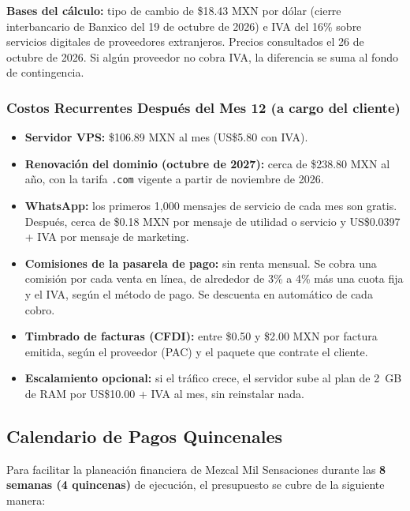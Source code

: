 \documentclass[11pt,letterpaper]{article}
\begin{document}
\noindent\textbf{Bases del cálculo:} tipo de cambio de \$18.43 MXN por dólar (cierre interbancario de Banxico del 19 de octubre de 2026) e IVA del 16\% sobre servicios digitales de proveedores extranjeros. Precios consultados el 26 de octubre de 2026. Si algún proveedor no cobra IVA, la diferencia se suma al fondo de contingencia.

\subsubsection{Costos Recurrentes Después del Mes 12 (a cargo del cliente)}

\begin{itemize}[leftmargin=1.5cm]
    \item \textbf{Servidor VPS:} \$106.89 MXN al mes (US\$5.80 con IVA).
    \item \textbf{Renovación del dominio (octubre de 2027):} cerca de \$238.80 MXN al año, con la tarifa \texttt{.com} vigente a partir de noviembre de 2026.
    \item \textbf{WhatsApp:} los primeros 1,000 mensajes de servicio de cada mes son gratis. Después, cerca de \$0.18 MXN por mensaje de utilidad o servicio y US\$0.0397 + IVA por mensaje de marketing.
    \item \textbf{Comisiones de la pasarela de pago:} sin renta mensual. Se cobra una comisión por cada venta en línea, de alrededor de 3\% a 4\% más una cuota fija y el IVA, según el método de pago. Se descuenta en automático de cada cobro.
    \item \textbf{Timbrado de facturas (CFDI):} entre \$0.50 y \$2.00 MXN por factura emitida, según el proveedor (PAC) y el paquete que contrate el cliente.
    \item \textbf{Escalamiento opcional:} si el tráfico crece, el servidor sube al plan de 2~GB de RAM por US\$10.00 + IVA al mes, sin reinstalar nada.
\end{itemize}

\subsection{Calendario de Pagos Quincenales}

Para facilitar la planeación financiera de Mezcal Mil Sensaciones durante las \textbf{8 semanas (4 quincenas)} de ejecución, el presupuesto se cubre de la siguiente manera:
\end{document}

